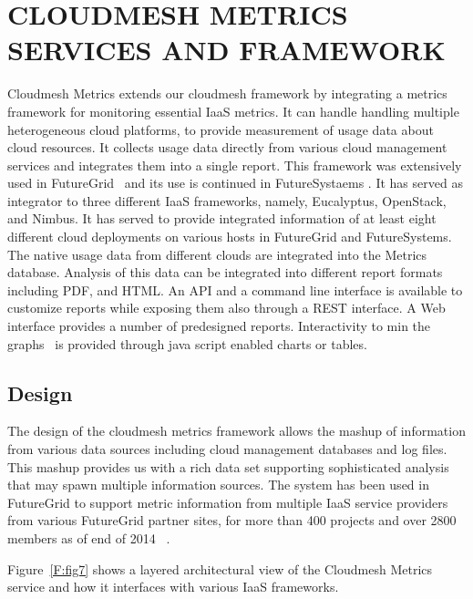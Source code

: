 \documentclass{sig-alternate-05-2015}
\newcommand{\hyungro}[1]{\todo[inline, color=green!20]{Hyungro:~#1}}
\begin{document}
\hyungro{describe what xras is}
\cite{hart2014xras}

\section{CLOUDMESH METRICS SERVICES AND FRAMEWORK}\label{S:cloudmesh}

Cloudmesh Metrics extends our cloudmesh framework \cite{??} by
integrating a metrics framework for monitoring essential IaaS
metrics. It can handle handling multiple heterogeneous cloud
platforms, to provide measurement of usage data about cloud resources.
It collects usage data directly from various cloud management services
and integrates them into a single report. This framework was
extensively used in FutureGrid~\cite{las2010gce,las12fg-bookchapter} and its use
is continued in FutureSystaems \cite{??}. It has served as integrator
to three different IaaS frameworks, namely, Eucalyptus, OpenStack, and
Nimbus. It has served to provide integrated information of at least
eight different cloud deployments on various hosts in FutureGrid and
FutureSystems.  The native usage data from different clouds are
integrated into the Metrics database. Analysis of this data can be
integrated into different report formats including PDF, and HTML. An
API and a command line interface is available to customize reports
while exposing them also through a REST interface. A Web interface
provides a number of predesigned reports. Interactivity to min the
graphs~\cite{highsoft2012highcharts} is provided through java script
enabled charts or tables.

\subsection{Design}

The design of the cloudmesh metrics framework allows the mashup of
information from various data sources including cloud management
databases and log files. This mashup provides us with a rich
data set supporting sophisticated analysis that may spawn multiple
information sources.
The system has been used in FutureGrid to support metric
information from multiple IaaS service providers from various 
FutureGrid partner sites, for more than 400 projects and over 
2800 members as of end of 2014 ~\cite{las14cloudmeshmultiple}.

Figure~\ref{F:fig7} shows a layered architectural
view of the Cloudmesh Metrics service and how it interfaces with
various IaaS frameworks.
\end{document}
